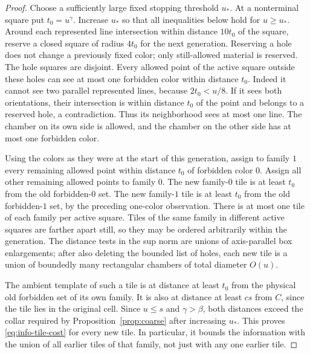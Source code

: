 \begin{proof}
Choose a sufficiently large fixed stopping threshold $u_*$.  At a
nonterminal square put $t_0=u^\gamma$.  Increase $u_*$ so that all
inequalities below hold for $u\ge u_*$.  Around each represented line
intersection within distance $10t_0$ of the square, reserve a closed
square of radius $4t_0$ for the next generation.  Reserving a hole does
not change a previously fixed color; only still-allowed material is
reserved.  The hole squares are disjoint.  Every allowed point of the
active square outside these holes can see at most one forbidden color
within distance $t_0$.  Indeed it cannot see two parallel represented
lines, because $2t_0<u/8$.  If it sees both orientations, their
intersection is within distance $t_0$ of the point and belongs to a
reserved hole, a contradiction.  Thus its neighborhood sees at most
one line.  The chamber on its own side is allowed, and the chamber on
the other side has at most one forbidden color.

Using the colors as they were at the start of this generation, assign
to family $1$ every remaining allowed point within distance $t_0$ of
forbidden color $0$.  Assign all other remaining allowed points to
family $0$.  The new family-$0$ tile is at least $t_0$ from the old
forbidden-$0$ set.  The new family-$1$ tile is at least $t_0$ from the
old forbidden-$1$ set, by the preceding one-color observation.  There
is at most one tile of each family per active square.  Tiles of the
same family in different active squares are farther apart still, so
they may be ordered arbitrarily within the generation.  The distance
tests in the sup norm are unions of axis-parallel box enlargements;
after also deleting the bounded list of holes, each new tile is a union
of boundedly many rectangular chambers of total diameter $O(u)$.

The ambient template of such a tile is at distance at least $t_0$ from
the physical old forbidden set of its own family.  It is also at
distance at least $cs$ from $C$, since the tile lies in the original
cell.  Since $u\le s$ and $\gamma>\beta$, both distances exceed the
collar required by Proposition~\ref{prop:coarse} after increasing $u_*$.
This proves \eqref{eq:info-tile-cost} for every new tile.  In particular,
it bounds the information with the union of all earlier tiles of that
family, not just with any one earlier tile.


\end{proof}
